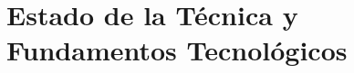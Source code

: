 \chapter{Estado de la Técnica y Fundamentos Tecnológicos}
\label{ch:estado-del-arte-y-fundamentos-tecnologicos}





